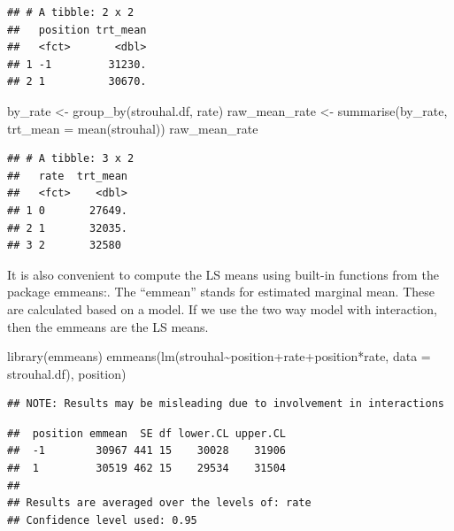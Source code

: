 \documentclass[
]{book}
\newenvironment{Shaded}{\begin{snugshade}}{\end{snugshade}}
\newcommand{\AttributeTok}[1]{\textcolor[rgb]{0.77,0.63,0.00}{#1}}
\newcommand{\FunctionTok}[1]{\textcolor[rgb]{0.00,0.00,0.00}{#1}}
\newcommand{\NormalTok}[1]{#1}
\newcommand{\OtherTok}[1]{\textcolor[rgb]{0.56,0.35,0.01}{#1}}
\newcommand{\SpecialCharTok}[1]{\textcolor[rgb]{0.00,0.00,0.00}{#1}}
\newcommand{\StringTok}[1]{\textcolor[rgb]{0.31,0.60,0.02}{#1}}
\begin{document}
\begin{verbatim}
## # A tibble: 2 x 2
##   position trt_mean
##   <fct>       <dbl>
## 1 -1         31230.
## 2 1          30670.
\end{verbatim}

\begin{Shaded}
\begin{Highlighting}[]
\NormalTok{by\_rate }\OtherTok{\textless{}{-}} \FunctionTok{group\_by}\NormalTok{(strouhal.df, rate)}
\NormalTok{raw\_mean\_rate }\OtherTok{\textless{}{-}} \FunctionTok{summarise}\NormalTok{(by\_rate, }\AttributeTok{trt\_mean =} \FunctionTok{mean}\NormalTok{(strouhal))}
\NormalTok{raw\_mean\_rate}
\end{Highlighting}
\end{Shaded}

\begin{verbatim}
## # A tibble: 3 x 2
##   rate  trt_mean
##   <fct>    <dbl>
## 1 0       27649.
## 2 1       32035.
## 3 2       32580
\end{verbatim}

It is also convenient to compute the LS means using built-in functions from the package emmeans:. The ``emmean'' stands for estimated marginal mean. These are calculated based on a model. If we use the two way model with interaction, then the emmeans are the LS means.

\begin{Shaded}
\begin{Highlighting}[]
\FunctionTok{library}\NormalTok{(emmeans)}
\FunctionTok{emmeans}\NormalTok{(}\FunctionTok{lm}\NormalTok{(strouhal}\SpecialCharTok{\textasciitilde{}}\NormalTok{position}\SpecialCharTok{+}\NormalTok{rate}\SpecialCharTok{+}\NormalTok{position}\SpecialCharTok{*}\NormalTok{rate, }\AttributeTok{data =}\NormalTok{ strouhal.df), }\StringTok{\textquotesingle{}position\textquotesingle{}}\NormalTok{)}
\end{Highlighting}
\end{Shaded}

\begin{verbatim}
## NOTE: Results may be misleading due to involvement in interactions
\end{verbatim}

\begin{verbatim}
##  position emmean  SE df lower.CL upper.CL
##  -1        30967 441 15    30028    31906
##  1         30519 462 15    29534    31504
## 
## Results are averaged over the levels of: rate 
## Confidence level used: 0.95
\end{verbatim}
\end{document}
